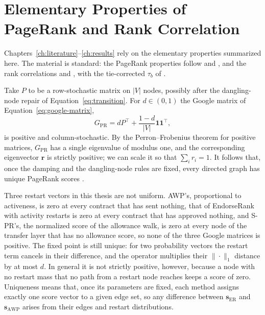 \section{Elementary Properties of PageRank and Rank Correlation}
\label{ch:appendix-theory}

Chapters~\ref{ch:literature}--\ref{ch:results} rely on the elementary properties summarized here. The material is standard: the PageRank properties follow \textcite{page1999pagerank} and \textcite{langville2006pagerank}, and the rank correlations \textcite{spearman1904proof} and \textcite{kendall1938rank}, with the tie-corrected $\tau_b$ of \textcite{kendall1945ties}.


Take $P$ to be a row-stochastic matrix on $|V|$ nodes, possibly after the dangling-node repair of Equation~\eqref{eq:transition}. For $d\in(0,1)$ the Google matrix of Equation~\eqref{eq:google-matrix},
\[
G_{\mathrm{PR}}=d P^{\top}+\frac{1-d}{|V|}\mathbf{1}\mathbf{1}^{\top},
\]
is positive and column-stochastic. By the Perron--Frobenius theorem for positive matrices, $G_{\mathrm{PR}}$ has a single eigenvalue of modulus one, and the corresponding eigenvector $\mathbf{r}$ is strictly positive; we can scale it so that $\sum_i r_i=1$. It follows that, once the damping and the dangling-node rules are fixed, every directed graph has unique PageRank scores \parencite{langville2006pagerank}.

Three restart vectors in this thesis are not uniform. AWP's, proportional to activeness, is zero at every contract that has sent nothing, that of EndorseRank with activity restarts is zero at every contract that has approved nothing, and \mbox{S-PR}'s, the normalized score of the allowance walk, is zero at every node of the transfer layer that has no allowance score, so none of the three Google matrices is positive. The fixed point is still unique: for two probability vectors the restart term cancels in their difference, and the operator multiplies their $\|\cdot\|_1$ distance by at most $d$. In general it is not strictly positive, however, because a node with no restart mass that no path from a restart node reaches keeps a score of zero. Uniqueness means that, once its parameters are fixed, each method assigns exactly one score vector to a given edge set, so any difference between $\mathbf{s}_{\mathrm{ER}}$ and $\mathbf{s}_{\mathrm{AWP}}$ arises from their edges and restart distributions.

